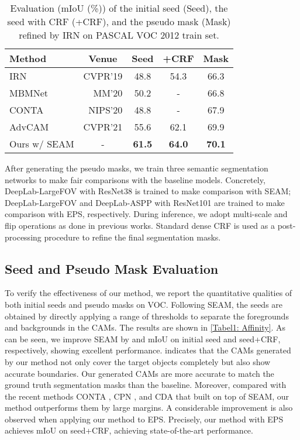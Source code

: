 \documentclass[10pt,twocolumn,letterpaper]{article}
\begin{document}
\begin{table}[tbp]
\caption{Evaluation (mIoU (\%)) of the initial seed (Seed), the seed with CRF (+CRF), and the pseudo mask (Mask) refined by IRN \cite{ahn2019weaklyIRNet} on PASCAL VOC 2012 train set.}
\small
\label{Table2: IRNet}
\centering
{}
\begin{tabular}{l|c|c|c|c}
\hline
\textbf{Method}          & \textbf{Venue}   & \textbf{Seed} & \textbf{+CRF} & \textbf{Mask} \\
\hline \hline
IRN \cite{ahn2019weaklyIRNet}            & \multicolumn{1}{r|}{CVPR'19} & 48.8 & 54.3 & 66.3 \\
MBMNet \cite{liu2020weaklyMBMNet}         & \multicolumn{1}{r|}{MM'20}   & 50.2 & -    & 66.8 \\
CONTA \cite{zhang2020causalCONTA}          & \multicolumn{1}{r|}{NIPS'20} & 48.8 & -    & 67.9 \\
AdvCAM \cite{lee2021antiADVCAM}         & \multicolumn{1}{r|}{CVPR'21} & 55.6 & 62.1 & 69.9 \\ 
\hline
Ours w/ SEAM & -       & \textbf{61.5} & \textbf{64.0} &\textbf{70.1} \\
\hline
\end{tabular}
\end{table}

After generating the pseudo masks, we train three semantic segmentation networks to make fair comparisons with the baseline models. Concretely, DeepLab-LargeFOV with ResNet38 is trained to make comparison with SEAM; DeepLab-LargeFOV and DeepLab-ASPP with ResNet101 are trained to make comparison with EPS, respectively.
During inference, we adopt multi-scale and flip operations as done in previous works.
Standard dense CRF is used as a post-processing procedure to refine the final segmentation masks. 



\subsection{Seed and Pseudo Mask Evaluation}
To verify the effectiveness of our method, we report the quantitative qualities of both initial seeds and pseudo masks on VOC. Following SEAM, the seeds are obtained by directly applying a range of thresholds to separate the foregrounds and backgrounds in the CAMs. The results are shown in \cref{Tabel1: Affinity}.
As can be seen, we improve SEAM by  and  mIoU on initial seed and seed+CRF, respectively, showing excellent performance.
 indicates that the CAMs generated by our method not only cover the target objects completely but also show accurate boundaries.
Our generated CAMs are more accurate to match the ground truth segmentation masks than the baseline.
Moreover, compared with the recent methods CONTA \cite{zhang2020causalCONTA}, CPN \cite{zhang2021complementaryCPN}, and CDA \cite{Su_2021_ICCV_CDA} that built on top of SEAM, our method outperforms them by large margins.
A considerable improvement is also observed when applying our method to EPS.
Precisely, our method with EPS achieves  mIoU on seed+CRF, achieving state-of-the-art performance.
\end{document}
